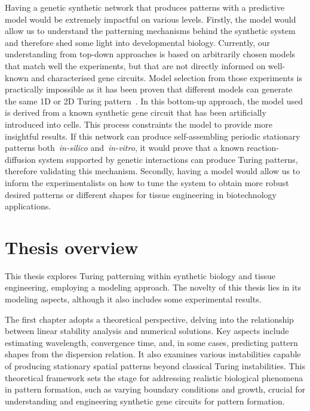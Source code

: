 Having a genetic synthetic network that produces patterns with a predictive model would be extremely impactful on various levels.
Firstly, the model would allow us to understand the patterning mechanisms behind the synthetic system and therefore shed some light into developmental biology.
Currently, our understanding from top-down approaches is based on arbitrarily chosen models that match well the experiments, but that are not directly informed on well-known and characterised gene circuits.
Model selection from those experiments is practically impossible as it has been proven that different models can generate the same 1D or 2D Turing pattern~\parencite{Woolley2021}.
In this bottom-up approach, the model used is derived from a known synthetic gene circuit that has been artificially introduced into cells.
This process constraints the model to provide more insightful results.
If this network can produce self-assembling periodic stationary patterns both~\textit{in-silico} and~\textit{in-vitro}, it would prove that a known reaction-diffusion system supported by genetic interactions can produce Turing patterns, therefore validating this mechanism.
Secondly, having a model would allow us to inform the experimentalists on how to tune the system to obtain more robust desired patterns or different shapes for tissue engineering in biotechnology applications.


\section{Thesis overview}


This thesis explores Turing patterning within synthetic biology and tissue engineering, employing a modeling approach.
The novelty of this thesis lies in its modeling aspects, although it also includes some experimental results.

The first chapter adopts a theoretical perspective, delving into the relationship between linear stability analysis and numerical solutions.
Key aspects include estimating wavelength, convergence time, and, in some cases, predicting pattern shapes from the dispersion relation.
It also examines various instabilities capable of producing stationary spatial patterns beyond classical Turing instabilities.
This theoretical framework sets the stage for addressing realistic biological phenomena in pattern formation, such as varying boundary conditions and growth, crucial for understanding and engineering synthetic gene circuits for pattern formation.

